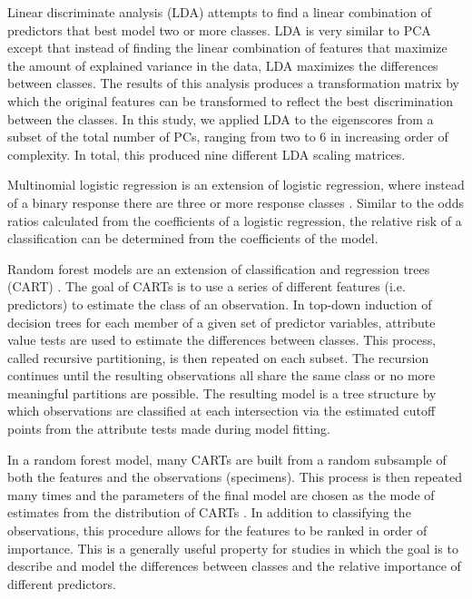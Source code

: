 \documentclass[12pt,letterpaper]{article}
\begin{document}
Linear discriminate analysis (LDA) attempts to find a linear combination of predictors that best model two or more classes. LDA is very similar to PCA except that instead of finding the linear combination of features that maximize the amount of explained variance in the data, LDA maximizes the differences between classes. The results of this analysis produces a transformation matrix by which the original features can be transformed to reflect the best discrimination between the classes. In this study, we applied LDA to the eigenscores from a subset of the total number of PCs, ranging from two to 6 in increasing order of complexity. In total, this produced nine different LDA scaling matrices. 

Multinomial logistic regression is an extension of logistic regression, where instead of a binary response there are three or more response classes \citep{Venables2002a}. Similar to the odds ratios calculated from the coefficients of a logistic regression, the relative risk of a classification can be determined from the coefficients of the model.

Random forest models are an extension of classification and regression trees (CART) \citep{Breiman1984,Breiman2001}. The goal of CARTs is to use a series of different features (i.e. predictors) to estimate the class of an observation. In top-down induction of decision trees for each member of a given set of predictor variables, attribute value tests are used to estimate the differences between classes. This process, called recursive partitioning, is then repeated on each subset. The recursion continues until the resulting observations all share the same class or no more meaningful partitions are possible. The resulting model is a tree structure by which observations are classified at each intersection via the estimated cutoff points from the attribute tests made during model fitting. %

In a random forest model, many CARTs are built from a random subsample of both the features and the observations (specimens). This process is then repeated many times and the parameters of the final model are chosen as the mode of estimates from the distribution of CARTs \citep{Breiman2001}. In addition to classifying the observations, this procedure allows for the features to be ranked in order of importance. This is a generally useful property for studies in which the goal is to describe and model the differences between classes and the relative importance of different predictors. 
\end{document}
